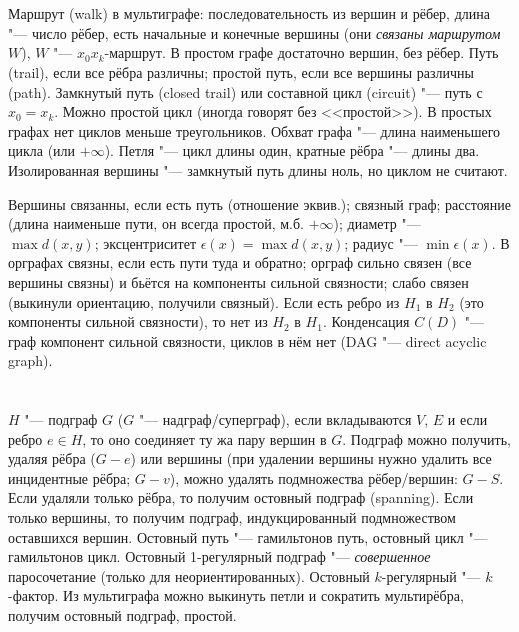 \section{} %
Маршрут (walk) в мультиграфе: последовательность из вершин и рёбер, длина "--- число рёбер, есть начальные и конечные вершины
(они \textit{связаны маршрутом $W$}), $W$ "--- $x_0x_k$-маршрут.
В простом графе достаточно вершин, без рёбер.
Путь (trail), если все рёбра различны; простой путь, если все вершины различны (path).
Замкнутый путь (closed trail) или составной цикл (circuit) "--- путь с $x_0=x_k$.
Можно простой цикл (иногда говорят без <<простой>>).
В простых графах нет циклов меньше треугольников.
Обхват графа "--- длина наименьшего цикла (или $+\infty$).
Петля "--- цикл длины один, кратные рёбра "--- длины два.
Изолированная вершины "--- замкнутый путь длины ноль, но циклом не считают.

Вершины связанны, если есть путь (отношение эквив.); связный граф;
расстояние (длина наименьше пути, он всегда простой, м.б. $+\infty$);
диаметр "--- $\max d(x, y)$;
эксцентриситет $\epsilon(x) = \max d(x, y)$;
радиус "--- $\min \epsilon(x)$.
В орграфах связны, если есть пути туда и обратно; орграф сильно связен (все вершины связны) и бьётся на компоненты
сильной связности; слабо связен (выкинули ориентацию, получили связный).
Если есть ребро из $H_1$ в $H_2$ (это компоненты сильной связности), то нет из $H_2$ в $H_1$.
Конденсация $C(D)$ "--- граф компонент сильной связности, циклов в нём нет (DAG "--- direct acyclic graph).

\section{} %
$H$ "--- подграф $G$ ($G$ "--- надграф/суперграф), если вкладываются $V$, $E$ и если ребро $e \in H$, то оно соединяет ту жа пару вершин в $G$.
Подграф можно получить, удаляя рёбра ($G - e$) или вершины (при удалении вершины нужно удалить все инцидентные рёбра; $G - v$),
можно удалять подмножества рёбер/вершин: $G-S$.
Если удаляли только рёбра, то получим остовный подграф (spanning).
Если только вершины, то получим подграф, индукцированный подмножеством оставшихся вершин.
Остовный путь "--- гамильтонов путь, остовный цикл "--- гамильтонов цикл.
Остовный 1-регулярный подграф "--- \textit{совершенное} паросочетание (только для неориентированных).
Остовный $k$-регулярный "--- $k$-фактор.
Из мультиграфа можно выкинуть петли и сократить мультирёбра, получим остовный подграф, простой.


